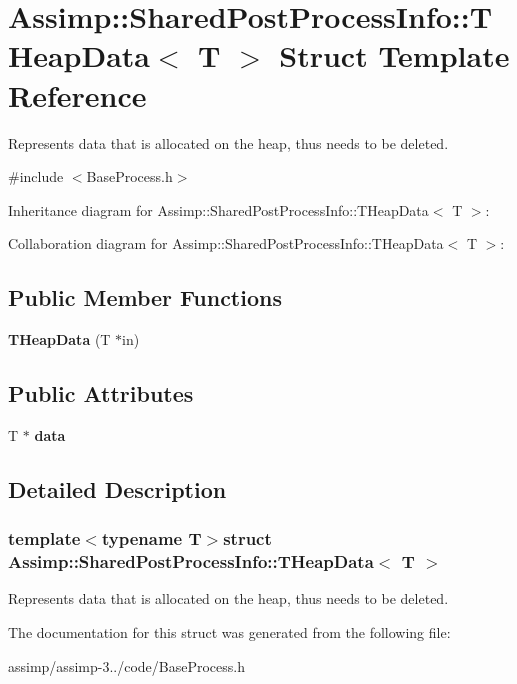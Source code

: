 \hypertarget{struct_assimp_1_1_shared_post_process_info_1_1_t_heap_data}{\section{Assimp\+:\+:Shared\+Post\+Process\+Info\+:\+:T\+Heap\+Data$<$ T $>$ Struct Template Reference}
\label{struct_assimp_1_1_shared_post_process_info_1_1_t_heap_data}
}


Represents data that is allocated on the heap, thus needs to be deleted.  




{\ttfamily \#include $<$Base\+Process.\+h$>$}



Inheritance diagram for Assimp\+:\+:Shared\+Post\+Process\+Info\+:\+:T\+Heap\+Data$<$ T $>$\+:


Collaboration diagram for Assimp\+:\+:Shared\+Post\+Process\+Info\+:\+:T\+Heap\+Data$<$ T $>$\+:
\subsection*{Public Member Functions}
\begin{DoxyCompactItemize}
\item 
\hypertarget{struct_assimp_1_1_shared_post_process_info_1_1_t_heap_data_af128be44bc784943293d2ef6c9a56720}{{\bfseries T\+Heap\+Data} (T $\ast$in)}\label{struct_assimp_1_1_shared_post_process_info_1_1_t_heap_data_af128be44bc784943293d2ef6c9a56720}

\end{DoxyCompactItemize}
\subsection*{Public Attributes}
\begin{DoxyCompactItemize}
\item 
\hypertarget{struct_assimp_1_1_shared_post_process_info_1_1_t_heap_data_afda885e02741800bdf73291d125ac228}{T $\ast$ {\bfseries data}}\label{struct_assimp_1_1_shared_post_process_info_1_1_t_heap_data_afda885e02741800bdf73291d125ac228}

\end{DoxyCompactItemize}


\subsection{Detailed Description}
\subsubsection*{template$<$typename T$>$struct Assimp\+::\+Shared\+Post\+Process\+Info\+::\+T\+Heap\+Data$<$ T $>$}

Represents data that is allocated on the heap, thus needs to be deleted. 

The documentation for this struct was generated from the following file\+:\begin{DoxyCompactItemize}
\item 
assimp/assimp-\/3../code/Base\+Process.\+h\end{DoxyCompactItemize}
